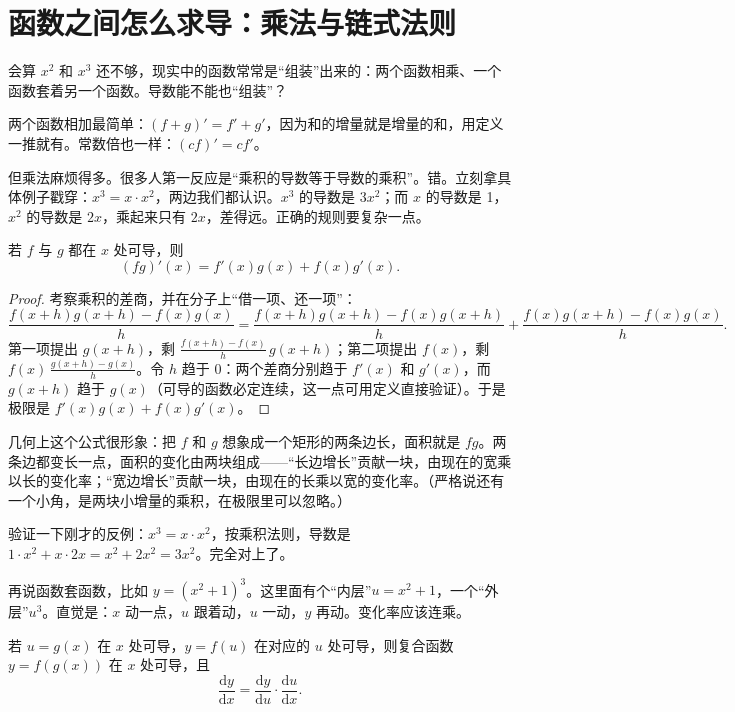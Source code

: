 \section{函数之间怎么求导：乘法与链式法则}

会算 $x^2$ 和 $x^3$ 还不够，现实中的函数常常是“组装”出来的：两个函数相乘、一个函数套着另一个函数。导数能不能也“组装”？

两个函数相加最简单：$(f+g)'=f'+g'$，因为和的增量就是增量的和，用定义一推就有。常数倍也一样：$(cf)'=cf'$。

但乘法麻烦得多。很多人第一反应是“乘积的导数等于导数的乘积”。错。立刻拿具体例子戳穿：$x^3=x\cdot x^2$，两边我们都认识。$x^3$ 的导数是 $3x^2$；而 $x$ 的导数是 1，$x^2$ 的导数是 $2x$，乘起来只有 $2x$，差得远。正确的规则要复杂一点。

\begin{dingli}[乘积法则]
若 $f$ 与 $g$ 都在 $x$ 处可导，则
\[
(fg)'(x)=f'(x)g(x)+f(x)g'(x).
\]
\end{dingli}

\begin{proof}
考察乘积的差商，并在分子上“借一项、还一项”：
\[
\frac{f(x+h)g(x+h)-f(x)g(x)}{h}
=\frac{f(x+h)g(x+h)-f(x)g(x+h)}{h}
+\frac{f(x)g(x+h)-f(x)g(x)}{h}.
\]
第一项提出 $g(x+h)$，剩 $\frac{f(x+h)-f(x)}{h}\,g(x+h)$；第二项提出 $f(x)$，剩 $f(x)\,\frac{g(x+h)-g(x)}{h}$。令 $h$ 趋于 0：两个差商分别趋于 $f'(x)$ 和 $g'(x)$，而 $g(x+h)$ 趋于 $g(x)$（可导的函数必定连续，这一点可用定义直接验证）。于是极限是 $f'(x)g(x)+f(x)g'(x)$。
\end{proof}

几何上这个公式很形象：把 $f$ 和 $g$ 想象成一个矩形的两条边长，面积就是 $fg$。两条边都变长一点，面积的变化由两块组成——“长边增长”贡献一块，由现在的宽乘以长的变化率；“宽边增长”贡献一块，由现在的长乘以宽的变化率。（严格说还有一个小角，是两块小增量的乘积，在极限里可以忽略。）

验证一下刚才的反例：$x^3=x\cdot x^2$，按乘积法则，导数是 $1\cdot x^2+x\cdot 2x=x^2+2x^2=3x^2$。完全对上了。

再说函数套函数，比如 $y=(x^2+1)^3$。这里面有个“内层”$u=x^2+1$，一个“外层”$u^3$。直觉是：$x$ 动一点，$u$ 跟着动，$u$ 一动，$y$ 再动。变化率应该连乘。

\begin{dingli}[链式法则]
若 $u=g(x)$ 在 $x$ 处可导，$y=f(u)$ 在对应的 $u$ 处可导，则复合函数 $y=f(g(x))$ 在 $x$ 处可导，且
\[
\frac{\mathrm{d}y}{\mathrm{d}x}=\frac{\mathrm{d}y}{\mathrm{d}u}\cdot\frac{\mathrm{d}u}{\mathrm{d}x}.
\]
\end{dingli}

